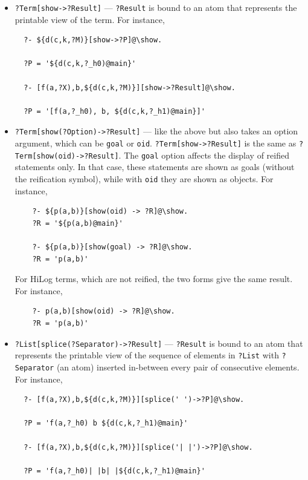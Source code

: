 \documentclass[11pt]{article}
\begin{document}
\begin{itemize}
\item  \texttt{?Term[show->?Result]} --- \texttt{?Result} is bound to an atom
  that represents the printable view of the term. For instance,
\begin{verbatim}
  ?- ${d(c,k,?M)}[show->?P]@\show.

  ?P = '${d(c,k,?_h0)@main}'

  ?- [f(a,?X),b,${d(c,k,?M)}][show->?Result]@\show.  

  ?P = '[f(a,?_h0), b, ${d(c,k,?_h1)@main}]'
\end{verbatim}

\item \texttt{?Term[show(?Option)->?Result]} --- like the above but also
  takes an option argument, which can be \texttt{goal} or \texttt{oid}.
  \texttt{?Term[show->?Result]} is the same as
  \texttt{?Term[show(oid)->?Result]}. The \texttt{goal} option affects the
  display of reified statements only. In that case, these statements are
  shown as goals (without the reification symbol), while with \texttt{oid} they are shown as objects. For
  instance, 
\begin{verbatim}
    ?- ${p(a,b)}[show(oid) -> ?R]@\show.  
    ?R = '${p(a,b)@main}'

    ?- ${p(a,b)}[show(goal) -> ?R]@\show.  
    ?R = 'p(a,b)'
\end{verbatim}
  For HiLog terms, which are not reified, the two forms give the same
  result. For instance,
\begin{verbatim}
    ?- p(a,b)[show(oid) -> ?R]@\show.
    ?R = 'p(a,b)'
\end{verbatim}

\item \texttt{?List[splice(?Separator)->?Result]} --- \texttt{?Result} is
  bound to an atom that represents the printable view of the sequence of
  elements in \texttt{?List}  with \texttt{?Separator} (an atom) inserted
  in-between every pair of consecutive elements. For instance,
\begin{verbatim}
  ?- [f(a,?X),b,${d(c,k,?M)}][splice(' ')->?P]@\show.

  ?P = 'f(a,?_h0) b ${d(c,k,?_h1)@main}'
  
  ?- [f(a,?X),b,${d(c,k,?M)}][splice('| |')->?P]@\show.

  ?P = 'f(a,?_h0)| |b| |${d(c,k,?_h1)@main}'
\end{verbatim}
\end{itemize}
\end{document}
